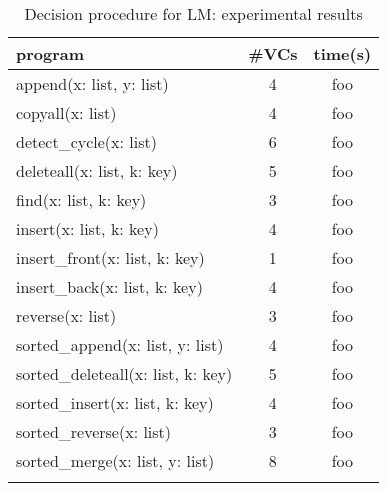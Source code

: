 \begin{longtable}{| l| c| c|} 
\hline
 program & \#VCs & time(s) \\ 
\hline
append(x: list, y: list) & 4 & foo \\ 
copyall(x: list) & 4 & foo \\ 
detect\_cycle(x: list) & 6 & foo \\ 
deleteall(x: list, k: key) & 5 & foo \\ 
find(x: list, k: key) & 3 & foo \\ 
insert(x: list, k: key) & 4 & foo \\ 
insert\_front(x: list, k: key) & 1 & foo\\ 
insert\_back(x: list, k: key) & 4 & foo\\ 
reverse(x: list) & 3 & foo\\ 
\hline
sorted\_append(x: list, y: list) & 4 & foo \\ 
sorted\_deleteall(x: list, k: key) & 5 & foo \\ 
sorted\_insert(x: list, k: key) & 4 & foo \\ 
sorted\_reverse(x: list) & 3 & foo \\ 
sorted\_merge(x: list, y: list) & 8 & foo \\ 
\hline
\caption{Decision procedure for LM: experimental results} %
\label{experiments}
\end{longtable}